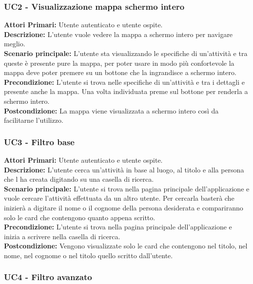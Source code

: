 \subsubsection{ UC2 - Visualizzazione mappa schermo intero}

\textbf{Attori Primari:} Utente autenticato e utente ospite.\\
\textbf{Descrizione:} L'utente vuole vedere la mappa a schermo intero per navigare meglio.\\
\textbf{Scenario principale:} L'utente sta visualizzando le specifiche di un'attività e tra queste è presente pure la mappa, per poter usare in modo più confortevole la mappa deve poter premere su un bottone che la ingrandisce a schermo intero.\\
\textbf{Precondizione:} L'utente si trova nelle specifiche di un'attività e tra i dettagli e presente anche la mappa. Una volta individuata preme sul bottone per renderla a schermo intero.\\
\textbf{Postcondizione:} La mappa viene visualizzata a schermo intero così da facilitarne l'utilizzo.\\

\subsubsection{ UC3 - Filtro base}

\textbf{Attori Primari:} Utente autenticato e utente ospite.\\
\textbf{Descrizione:} L'utente cerca un'attività in base al luogo, al titolo e alla persona che l ha creata digitando su una casella di ricerca.\\
\textbf{Scenario principale:} L'utente si trova nella pagina principale dell'applicazione e vuole cercare l'attività effettuata da un altro utente. Per cercarla basterà che inizierà a digitare il nome o il cognome della persona desiderata e compariranno solo le card che contengono quanto appena scritto.\\
\textbf{Precondizione:} L'utente si trova nella pagina principale dell'applicazione e inizia a scrivere nella casella di ricerca.\\
\textbf{Postcondizione:} Vengono visualizzate solo le card che contengono nel titolo, nel nome, nel cognome o nel titolo quello scritto dall'utente.\\

\subsubsection{ UC4 - Filtro avanzato}

